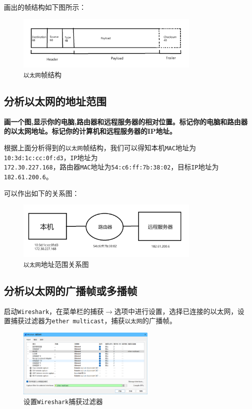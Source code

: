 \documentclass{article}
\begin{document}
画出的帧结构如下图所示：

\begin{figure}[H]
  \centering
  \includegraphics[width=0.8\textwidth]{images/09.png}
  \caption{\texttt{以太网}帧结构}
\end{figure}

\subsection{分析以太网的地址范围}

\textbf{画一个图,显示你的电脑,路由器和远程服务器的相对位置。标记你的电脑和路由器的以太网地址。标记你的计算机和远程服务器的IP地址。}

根据上面分析得到的\texttt{以太网}帧结构，我们可以得知本机\texttt{MAC}地址为\texttt{10:3d:1c:cc:0f:d3}，\texttt{IP}地址为\\\texttt{172.30.227.168}，路由器\texttt{MAC}地址为\texttt{54:c6:ff:7b:38:02}，目标\texttt{IP}地址为\texttt{182.61.200.6}。

可以作出如下的关系图：

\begin{figure}[H]
  \centering
  \includegraphics[width=0.8\textwidth]{images/10.png}
  \caption{\texttt{以太网}地址范围关系图}
\end{figure}

\subsection{分析以太网的广播帧或多播帧}

启动\texttt{Wireshark}，在菜单栏的捕获\(\to \)选项中进行设置，选择已连接的以太网，设置捕获过滤器为\texttt{ether multicast}，捕获\texttt{以太网}的广播帧。

\begin{figure}[H]
  \centering
  \includegraphics[width=0.6\textwidth]{images/11.png}
  \caption{设置\texttt{Wireshark}捕获过滤器}
\end{figure}
\end{document}
